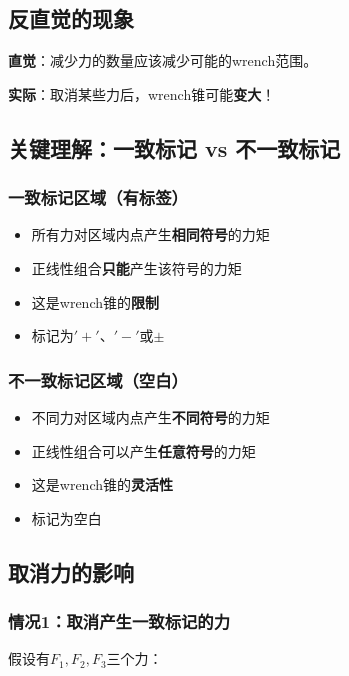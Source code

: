\documentclass[12pt,a4paper]{article}
\begin{document}
\subsection{反直觉的现象}

\textbf{直觉}：减少力的数量应该减少可能的wrench范围。

\textbf{实际}：取消某些力后，wrench锥可能\textbf{变大}！

\subsection{关键理解：一致标记 vs 不一致标记}

\subsubsection{一致标记区域（有标签）}

\begin{itemize}
    \item 所有力对区域内点产生\textbf{相同符号}的力矩
    \item 正线性组合\textbf{只能}产生该符号的力矩
    \item 这是wrench锥的\textbf{限制}
    \item 标记为$'+'$、$'-'$或$\pm$
\end{itemize}

\subsubsection{不一致标记区域（空白）}

\begin{itemize}
    \item 不同力对区域内点产生\textbf{不同符号}的力矩
    \item 正线性组合可以产生\textbf{任意符号}的力矩
    \item 这是wrench锥的\textbf{灵活性}
    \item 标记为空白
\end{itemize}

\subsection{取消力的影响}

\subsubsection{情况1：取消产生一致标记的力}

假设有$F_1, F_2, F_3$三个力：
\end{document}
